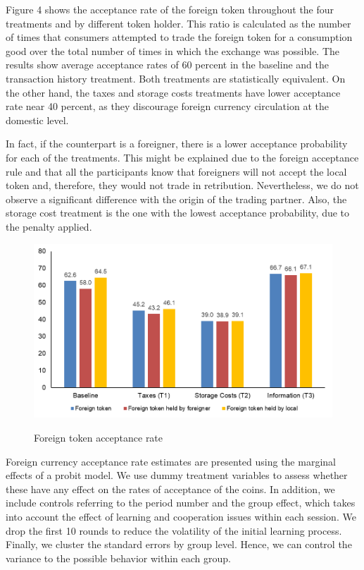Figure 4 shows the acceptance rate of the foreign token throughout the four treatments and by different token holder. This ratio is calculated as the number of times that consumers attempted to trade the foreign token for a consumption good over the total number of times in which the exchange was possible. The results show average acceptance rates of 60 percent in the baseline and the transaction history treatment. Both treatments are statistically equivalent. On the other hand, the taxes and storage costs treatments have lower acceptance rate near 40 percent, as they discourage foreign currency circulation at the domestic level.

In fact, if the counterpart is a foreigner, there is a lower acceptance probability for each of the treatments. This might be explained due to the foreign acceptance rule and that all the participants know that foreigners will not accept the local token and, therefore, they would not trade in retribution. Nevertheless, we do not observe a significant difference with the origin of the trading partner. Also, the storage cost treatment is the one with the lowest acceptance probability, due to the penalty applied. 

\begin{figure}
    
    \caption{Foreign token acceptance rate}
    \centering
    \includegraphics[scale=0.8]{summary.png}
     \label{fig:im1}

\end{figure}

  Foreign currency acceptance rate estimates are presented using the marginal effects of a probit model. We use dummy treatment variables to assess whether these have any effect on the rates of acceptance of the coins. In addition, we include controls referring to the period number and the group effect, which takes into account the effect of learning and cooperation issues within each session. We drop the first 10 rounds to reduce the volatility of the initial learning process. Finally, we cluster the standard errors by group level. Hence, we can control the variance to the possible behavior within each group.


